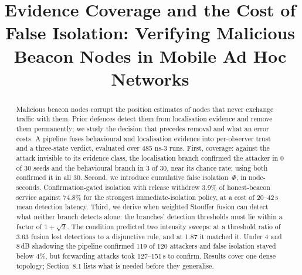 \newcommand{\PENDING}[1]{\textcolor{red}{[PENDING: #1]}}


\title{Evidence Coverage and the Cost of False Isolation: Verifying
Malicious Beacon Nodes in Mobile Ad Hoc Networks}


\begin{abstract}
Malicious beacon nodes corrupt the position estimates of nodes that never
exchange traffic with them. Prior defences detect them from localisation
evidence and remove them permanently; we study the decision that precedes
removal and what an error costs. A pipeline fuses behavioural and
localisation evidence into per-observer trust and a three-state verdict,
evaluated over 485 ns-3 runs. First, coverage: against the attack invisible
to its evidence class, the localisation branch confirmed the attacker in 0
of 30 seeds and the behavioural branch in 3 of 30, near its chance rate;
using both confirmed it in all 30. Second, we introduce cumulative false
isolation~$\Phi$, in node-seconds. Confirmation-gated isolation with
release withdrew 3.9\% of honest-beacon service against 74.8\% for the
strongest immediate-isolation policy, at a cost of 20--42\,s mean
detection latency. Third, we derive when weighted Stouffer fusion can
detect what neither branch detects alone: the branches' detection
thresholds must lie within a factor of $1+\sqrt{2}$. The condition
predicted two intensity sweeps: at a threshold ratio of 3.63 fusion lost
detections to a disjunctive rule, and at 1.87 it matched it. Under 4 and
8\,dB shadowing the pipeline confirmed 119 of 120 attackers and false
isolation stayed below 4\%, but forwarding attacks took 127--151\,s to
confirm. Results cover one dense topology; Section~8.1 lists what is
needed before they generalise.
\end{abstract}


